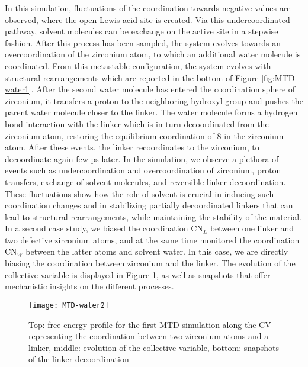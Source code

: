 In this simulation, fluctuations of the coordination towards negative values are observed, where the open Lewis acid site is created. Via this undercoordinated pathway, solvent molecules can be exchange on the active site in a stepwise fashion. After this process has been sampled, the system evolves towards an overcoordination of the zirconium atom, to which an additional water molecule is coordinated. From this metastable configuration, the system evolves with structural rearrangements which are reported in the bottom of Figure \ref{fig:MTD-water1}. After the second water molecule has entered the coordination sphere of zirconium, it transfers a proton to the neighboring hydroxyl group and pushes the parent water molecule closer to the linker. The water molecule forms a hydrogen bond interaction with the linker which is in turn decoordinated from the zirconium atom, restoring the equilibrium coordination of 8 in the zirconium atom. After these events, the linker recoordinates to the zirconium, to decoordinate again few ps later. In the simulation, we observe a plethora of events such as undercoordination and overcoordination of zirconium, proton transfers, exchange of solvent molecules, and reversible linker decoordination. These fluctuations show how the role of solvent is crucial in inducing such coordination changes and in stabilizing partially decoordinated linkers that can lead to structural rearrangements, while maintaining the stability of the material. 
\npar
In a second case study, we biased the coordination CN$_L$ between one linker and two defective zirconium atoms, and at the same time monitored the coordination CN$_W$ between the latter atoms and solvent water. In this case, we are directly biasing the coordination between zirconium and the linker. The evolution of the collective variable is displayed in Figure \ref{fig:MTD-water2}, as well as snapshots that offer mechanistic insights on the different processes. 
\npar
\begin{figure}[!htbp]
	\centering
	\texttt{[image: MTD-water2]}
	\caption{Top: free energy profile for the first MTD simulation along the CV representing the coordination between two zirconium atoms and a linker, middle: evolution of the collective variable, bottom: snapshots of the linker decoordination}
	\label{fig:MTD-water2}
\end{figure}
